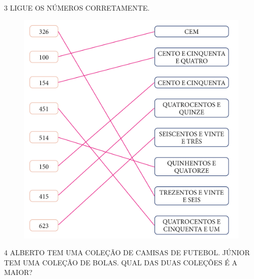 
\pagebreak
\num{3} LIGUE OS NÚMEROS CORRETAMENTE.

\begin{figure}[htpb!]
\includegraphics[width=\textwidth]{../ilustracoes/MAT1/SAEB_1ANO_MAT_FIGURA4.png}
\end{figure}

\pagebreak
\num{4} ALBERTO TEM UMA COLEÇÃO DE CAMISAS DE FUTEBOL. JÚNIOR TEM UMA COLEÇÃO DE BOLAS. QUAL DAS DUAS COLEÇÕES É A MAIOR?


